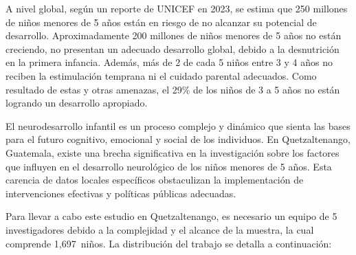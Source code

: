 \documentclass[11pt,letterpaper]{report}
\newcommand{\muestradeseada}{1,697}
\begin{document}
A nivel global, según un reporte de UNICEF en 2023, se estima que 250 millones
de niños menores de 5 años están en riesgo de no alcanzar su potencial de
desarrollo. Aproximadamente 200 millones de niños menores de 5 años no están
creciendo, no presentan un adecuado desarrollo global, debido a la desnutrición
en la primera infancia. Además, más de 2 de cada 5 niños entre 3 y 4 años no
reciben la estimulación temprana ni el cuidado parental adecuados. Como
resultado de estas y otras amenazas, el 29\% de los niños de 3 a 5 años no
están logrando un desarrollo apropiado. \cite{UNICEF2023}

El neurodesarrollo infantil es un proceso complejo y dinámico que sienta las
bases para el futuro cognitivo, emocional y social de los individuos. En
Quetzaltenango, Guatemala, existe una brecha significativa en la investigación
sobre los factores que influyen en el desarrollo neurológico de los niños
menores de 5 años. Esta carencia de datos locales específicos obstaculizan la
implementación de intervenciones efectivas y políticas públicas adecuadas.

Para llevar a cabo este estudio en Quetzaltenango, es necesario un equipo de 5
investigadores debido a la complejidad y el alcance de la muestra, la cual
comprende \muestradeseada\ niños. La distribución del trabajo se detalla a
continuación:
\end{document}
